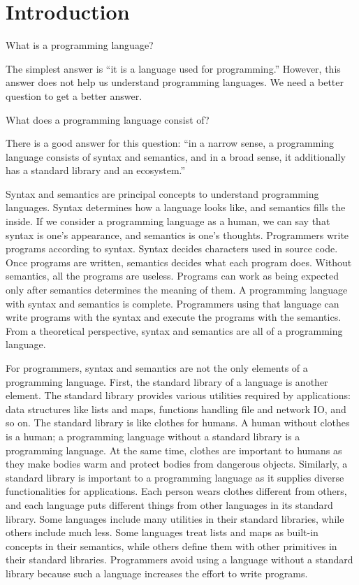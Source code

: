 \setchapterpreamble[u]{\margintoc}
\chapter{Introduction}

What is a programming language?

The simplest answer is ``it is a language used for programming.'' However, this
answer does not help us understand programming languages. We need a better
question to get a better answer.

What does a programming language consist of?

There is a good answer for this question: ``in a narrow sense, a programming
language consists of syntax and semantics, and in a broad sense, it additionally
has a standard library and an ecosystem.''

Syntax and semantics are principal concepts to understand programming languages.
Syntax determines how a language looks like, and semantics fills the inside. If
we consider a programming language as a human, we can say that syntax is one’s
appearance, and semantics is one’s thoughts. Programmers write programs
according to syntax. Syntax decides characters used in source code. Once programs
are written, semantics decides what each program does. Without semantics, all
the programs are useless. Programs can work as being expected only after
semantics determines the meaning of them. A programming language with syntax and
semantics is complete. Programmers using that language can write programs with
the syntax and execute the programs with the semantics. From a theoretical
perspective, syntax and semantics are all of a programming language.

For programmers, syntax and semantics are not the only elements of a programming
language. First, the standard library of a language is another element. The
standard library provides various utilities required by applications: data
structures like lists and maps, functions handling file and network IO, and so
on. The standard library is like clothes for humans. A human without clothes is
a human; a programming language without a standard library is a programming
language. At the same time, clothes are important to humans as they make bodies
warm and protect bodies from dangerous objects. Similarly, a standard library is
important to a programming language as it supplies diverse functionalities for
applications. Each person wears clothes different from others, and each language
puts different things from other languages in its standard library. Some
languages include many utilities in their standard libraries, while others
include much less. Some languages treat lists and maps as built-in concepts in
their semantics, while others define them with other primitives in their standard libraries.
Programmers avoid using a language without a standard library because such a
language increases the effort to write programs.

